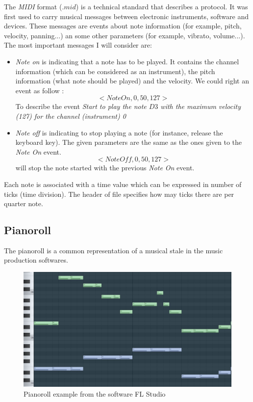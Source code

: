 \documentclass[12pt]{report}
\begin{document}
The \textit{MIDI} format ($.mid$) is a technical standard that describes a protocol.
It was first used to carry musical messages between electronic instruments, software and devices. These messages are events about note information (for example, pitch, velocity, panning...) an some other parameters (for example, vibrato, volume...). 
The most important messages I will consider are:
\begin{itemize}
    \item \textit{Note on} is indicating that a note has to be played. It contains the channel information (which can be considered as an instrument), the pitch information (what note should be played) and the velocity. We could right an event as follow :
    \begin{equation}
        <NoteOn, 0, 50, 127>
    \end{equation}
    To describe the event \textit{Start to play the note $D3$ with the maximum velocity (127) for the channel (instrument) 0}
    \item \textit{Note off} is indicating to stop playing a note (for instance, release the keyboard key). The given parameters are the same as the ones given to the \textit{Note On} event.
    \begin{equation}
        <NoteOff, 0, 50, 127>
    \end{equation}
    will stop the note started with the previous \textit{Note On} event.
\end{itemize}

Each note is associated with a time value which can be expressed in number of ticks (time division). The header of file specifies how may ticks there are per quarter note.

\subsection{Pianoroll}

The pianoroll is a common representation of a musical stale in the music production softwares.

\begin{figure}[H]
    \centering
    \includegraphics[width=0.75 \textwidth]{images/music/pianoroll/pianoroll_flstudio.jpg}
    \caption{Pianoroll example from the software FL Studio \cite{noauthor_fl_nodate}}
    \label{fig:pianoroll_flstudio}
\end{figure}
\end{document}
